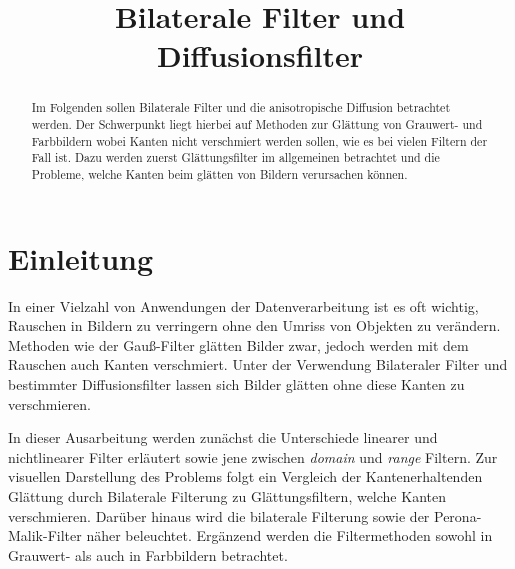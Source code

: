 \documentclass[conference]{IEEEtran}
\begin{document}
%
\title{Bilaterale Filter und Diffusionsfilter}


\author{
}


\maketitle


\begin{abstract}

Im Folgenden sollen Bilaterale Filter und die anisotropische Diffusion betrachtet werden. Der Schwerpunkt liegt hierbei auf Methoden zur Glättung von Grauwert- und Farbbildern wobei Kanten nicht verschmiert werden sollen, wie es bei vielen Filtern der Fall ist. Dazu werden zuerst Glättungsfilter im allgemeinen betrachtet und die Probleme, welche Kanten beim glätten von Bildern verursachen können. 

\end{abstract}

\IEEEpeerreviewmaketitle



\section{Einleitung}

In einer Vielzahl von Anwendungen der Datenverarbeitung ist es oft wichtig, Rauschen in Bildern zu verringern ohne den Umriss von Objekten zu verändern. Methoden wie der Gauß-Filter glätten Bilder zwar, jedoch werden mit dem Rauschen auch Kanten verschmiert. Unter der Verwendung Bilateraler Filter \cite{tomasi1998bilateral} und bestimmter Diffusionsfilter \cite{perona1990scale} lassen sich Bilder glätten ohne diese Kanten zu verschmieren.

In dieser Ausarbeitung werden zunächst die Unterschiede linearer und nichtlinearer Filter erläutert sowie jene zwischen \textit{domain} und \textit{range} Filtern. Zur visuellen Darstellung des Problems folgt ein Vergleich der Kantenerhaltenden Glättung durch Bilaterale Filterung zu Glättungsfiltern, welche Kanten verschmieren. Darüber hinaus wird die bilaterale Filterung sowie der Perona-Malik-Filter näher beleuchtet. Ergänzend werden die Filtermethoden sowohl in Grauwert- als auch in Farbbildern betrachtet.
\end{document}

